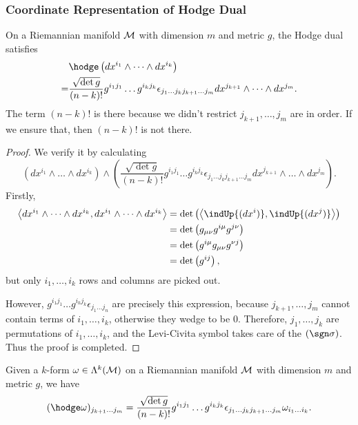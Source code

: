 \documentclass[../main.tex]{subfiles}
\begin{document}
    \subsubsection{Coordinate Representation of Hodge Dual}
    \begin{theorem}\label{thm:hodge-dual-basis}
        On a Riemannian manifold \(\manifold[M]\) with dimension \(m\) and metric 
        \(g\), the Hodge dual satisfies 
        \[
        \begin{aligned}
            &\hodge \left(dx^{i_1}\wedge \dots\wedge dx^{i_k}\right)\\
            =&\frac{\sqrt{\det g}}{(n-k)!}g^{i_1j_1}\dots g^{i_kj_k}
            \epsilon_{j_1\dots j_k j_{k+1}\dots j_m} dx^{j_{k+1}}\wedge\dots\wedge
            dx^{j_m}.
        \end{aligned}
        \]
        The term \((n-k)!\) is there because we didn't restrict \(j_{k+1}, \dots, 
        j_m\) are in order. If we ensure that, then \((n-k)!\) is not there.
    \end{theorem}
    \begin{proof}
        We verify it by calculating 
        \[
        \left(dx^{i_1}\wedge\dots\wedge dx^{i_k}\right) \wedge 
        \left(\frac{\sqrt{\det g}}{(n-k)!}g^{i_1j_1}\dots g^{i_kj_k}
        \epsilon_{j_1\dots j_k j_{k+1}\dots j_m} dx^{j_{k+1}}\wedge\dots\wedge
        dx^{j_m}\right).
        \]
        Firstly, 
        \[
        \begin{aligned}
            \left<dx^{i_1}\wedge\dots\wedge dx^{i_k}, 
            dx^{i_1}\wedge\dots\wedge dx^{i_k}\right>
            &=\det \left(\left<\indUp{(dx^i)}, \indUp{(dx^j)}\right>\right)\\
            &=\det \left(g_{\mu\nu}g^{i\mu}g^{j\nu}\right)\\
            &=\det \left(g^{i\mu}g_{\mu\nu}g^{\nu j}\right)\\
            &=\det \left(g^{ij}\right),
        \end{aligned}
        \]
        but only \(i_1, \dots, i_k\) rows and columns are picked out.\par
        However, \(g^{i_1j_1}\dots g^{i_kj_k}\epsilon_{j_1\dots j_n}\) are precisely 
        this expression, because \(j_{k+1}, \dots, j_m\) cannot contain terms of 
        \(i_1, \dots, i_k\), otherwise they wedge to be \(0\). Therefore, 
        \(j_1, \dots, j_k\) are permutations of \(i_1, \dots, i_k\), and the 
        Levi-Civita symbol takes care of the \((\sgn \sigma)\). Thus the proof is 
        completed.
    \end{proof}
    \begin{corollary}\label{cor:hodge-dual-coordinates}
        Given a \(k\)-form \(\omega \in \form{k}{M}\) on a Riemannian manifold 
        \(\manifold[M]\) with dimension \(m\) and metric \(g\), we have 
        \[
        (\hodge\omega)_{j_{k+1}\dots j_m} = 
        \frac{\sqrt{\det g}}{(n-k)!}g^{i_1j_1}\dots g^{i_kj_k}
        \epsilon_{j_1\dots j_k j_{k+1}\dots j_m} \omega_{i_1\dots i_k}.
        \]
    \end{corollary}
\end{document}
